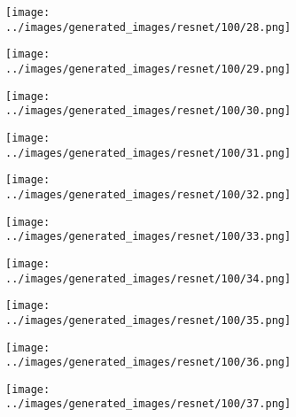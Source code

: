 \begin{figure}[H]
\begin{subfigure}[b]{0.1\textwidth}
 \centering
 \texttt{[image: ../images/generated\_images/resnet/100/28.png]}
\end{subfigure}
\hspace{1em}%
\begin{subfigure}[b]{0.1\textwidth}
\centering
\texttt{[image: ../images/generated\_images/resnet/100/29.png]}
\end{subfigure}
\hspace{1em}%
\begin{subfigure}[b]{0.1\textwidth}
\centering
\texttt{[image: ../images/generated\_images/resnet/100/30.png]}
\end{subfigure}
\hspace{1em}%
\begin{subfigure}[b]{0.1\textwidth}
\centering
\texttt{[image: ../images/generated\_images/resnet/100/31.png]}
\end{subfigure}
\hspace{1em}%
\begin{subfigure}[b]{0.1\textwidth}
\centering
\texttt{[image: ../images/generated\_images/resnet/100/32.png]}
\end{subfigure}
\hspace{1em}%
\begin{subfigure}[b]{0.1\textwidth}
\centering
\texttt{[image: ../images/generated\_images/resnet/100/33.png]}
\end{subfigure}
\hspace{1em}%
\begin{subfigure}[b]{0.1\textwidth}
\centering
\texttt{[image: ../images/generated\_images/resnet/100/34.png]}
\end{subfigure}
\hspace{1em}%
\begin{subfigure}[b]{0.1\textwidth}
\centering
\texttt{[image: ../images/generated\_images/resnet/100/35.png]}
\end{subfigure}
\hspace{1em}%
\begin{subfigure}[b]{0.1\textwidth}
\centering
\texttt{[image: ../images/generated\_images/resnet/100/36.png]}
\end{subfigure}
\hspace{1em}%
\begin{subfigure}[b]{0.1\textwidth}
\centering
\texttt{[image: ../images/generated\_images/resnet/100/37.png]}

\end{subfigure}
\end{figure}
